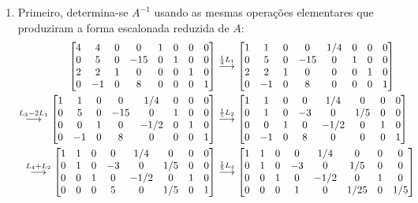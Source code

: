 \documentclass[12pt,a4paper]{article}
\newcommand{\grstep}[2][\relax]{%
   \ensuremath{\mathrel{
       {\mathop{\longrightarrow}\limits^{#2\mathstrut}_{
                                     \begin{subarray}{l} #1 \end{subarray}}}}}}
\begin{document}
\begin{enumerate}
\begin{enumerate}
\item Primeiro, determina-se $A^{-1}$ usando as mesmas operações elementares que produziram a forma escalonada reduzida de $A$:
\begin{align*}
\begin{bmatrix}
4 &  4 & 0 &   0 & 1 & 0 & 0 & 0 \\
0 &  5 & 0 & -15 & 0 & 1 & 0 & 0 \\
2 &  2 & 1 &   0 & 0 & 0 & 1 & 0 \\
0 & -1 & 0 &   8 & 0 & 0 & 0 & 1
\end{bmatrix}
&
\grstep{ \frac{1}{4} L_1 }
\begin{bmatrix}
1 &  1 & 0 &   0 & 1/4 & 0 & 0 & 0 \\
0 &  5 & 0 & -15 & 0 & 1 & 0 & 0 \\
2 &  2 & 1 &   0 & 0 & 0 & 1 & 0 \\
0 & -1 & 0 &   8 & 0 & 0 & 0 & 1
\end{bmatrix} \\
\grstep{ L_3 - 2 L_1 }
\begin{bmatrix}
1 &  1 & 0 &   0 & 1/4 & 0 & 0 & 0 \\
0 &  5 & 0 & -15 & 0 & 1 & 0 & 0 \\
0 &  0 & 1 &   0 & -1/2 & 0 & 1 & 0 \\
0 & -1 & 0 &   8 & 0 & 0 & 0 & 1
\end{bmatrix}
& 
\grstep{ \frac{1}{5} L_2 }
\begin{bmatrix}
1 &  1 & 0 &   0 & 1/4 & 0 & 0 & 0 \\
0 &  1 & 0 & -3 & 0 & 1/5 & 0 & 0 \\
0 &  0 & 1 &   0 & -1/2 & 0 & 1 & 0 \\
0 & -1 & 0 &   8 & 0 & 0 & 0 & 1
\end{bmatrix} \\
\grstep{ L_4 + L_2 }
\begin{bmatrix}
1 & 1 & 0 &  0 & 1/4 & 0 & 0 & 0 \\
0 & 1 & 0 & -3 & 0 & 1/5 & 0 & 0 \\
0 & 0 & 1 &  0 & -1/2 & 0 & 1 & 0 \\
0 & 0 & 0 &  5 & 0 & 1/5 & 0 & 1
\end{bmatrix}
&
\grstep{ \frac{1}{5} L_4 }
\begin{bmatrix}
1 & 1 & 0 &  0 & 1/4 & 0 & 0 & 0 \\
0 & 1 & 0 & -3 & 0 & 1/5 & 0 & 0 \\
0 & 0 & 1 &  0 & -1/2 & 0 & 1 & 0 \\
0 & 0 & 0 &  1 & 0 & 1/25 & 0 & 1/5

\end{bmatrix}
\end{align*}
\end{enumerate}
\end{enumerate}
\end{document}
